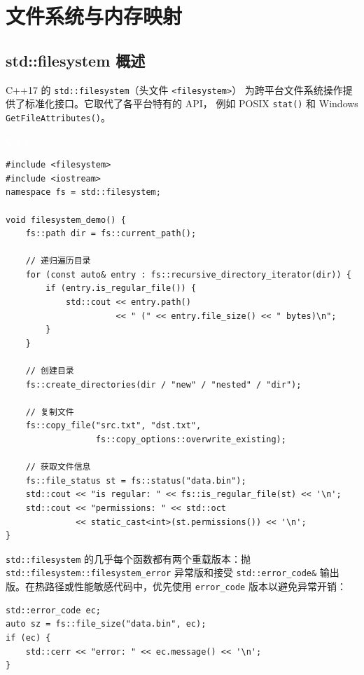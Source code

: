 \documentclass[12pt,a4paper,fontset=fandol]{ctexbook}
\newcommand{\Fn}[1]{\texttt{#1()}}
\newcommand{\Tp}[1]{\texttt{#1}}
\newcommand{\cpplabel}{%
  \noindent\begin{tcolorbox}[sharp corners,colback=algheadbg,colframe=algheadbg,
    left=6pt,right=6pt,top=2pt,bottom=2pt,boxrule=0pt]
  \textcolor{white}{\small\bfseries\sffamily C++}\end{tcolorbox}%
}
\begin{document}
\chapter{文件系统与内存映射}

\section{std::filesystem 概述}

C++17 的 \Tp{std::filesystem}（头文件 \Tp{<filesystem>}）
为跨平台文件系统操作提供了标准化接口。它取代了各平台特有的 API，
例如 POSIX \Fn{stat} 和 Windows \Fn{GetFileAttributes}。

\cpplabel
\begin{lstlisting}
#include <filesystem>
#include <iostream>
namespace fs = std::filesystem;

void filesystem_demo() {
    fs::path dir = fs::current_path();

    // 递归遍历目录
    for (const auto& entry : fs::recursive_directory_iterator(dir)) {
        if (entry.is_regular_file()) {
            std::cout << entry.path()
                      << " (" << entry.file_size() << " bytes)\n";
        }
    }

    // 创建目录
    fs::create_directories(dir / "new" / "nested" / "dir");

    // 复制文件
    fs::copy_file("src.txt", "dst.txt",
                  fs::copy_options::overwrite_existing);

    // 获取文件信息
    fs::file_status st = fs::status("data.bin");
    std::cout << "is regular: " << fs::is_regular_file(st) << '\n';
    std::cout << "permissions: " << std::oct
              << static_cast<int>(st.permissions()) << '\n';
}
\end{lstlisting}

\begin{guideline}[title=错误处理：异常 vs error\_code]
\Tp{std::\allowbreak{}filesystem} 的几乎每个函数都有两个重载版本：抛 \Tp{std::\allowbreak{}filesystem::\allowbreak{}filesystem\_\allowbreak{}error} 异常版和接受 \Tp{std::\allowbreak{}error\_\allowbreak{}code\&} 输出版。在热路径或性能敏感代码中，优先使用 \Tp{error\_code} 版本以避免异常开销：

\begin{lstlisting}
std::error_code ec;
auto sz = fs::file_size("data.bin", ec);
if (ec) {
    std::cerr << "error: " << ec.message() << '\n';
}
\end{lstlisting}
\end{guideline}
\end{document}
